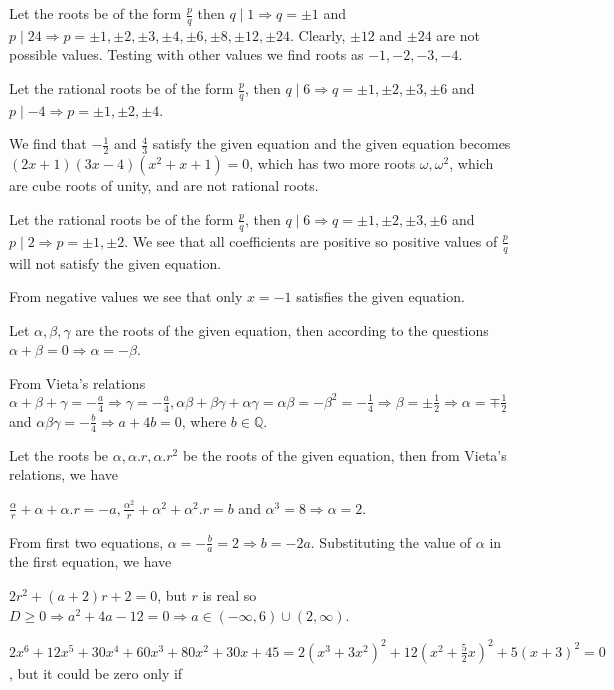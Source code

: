   Let the roots be of the form $\frac{p}{q}$ then $q\mid 1 \Rightarrow q = \pm 1$ and $p\mid 24 \Rightarrow
  p = \pm1, \pm2, \pm3, \pm4, \pm6, \pm8, \pm12, \pm24$. Clearly, $\pm12$ and $\pm24$ are not possible
  values. Testing with other values we find roots as $-1, -2, -3, -4$.
\item Let the rational roots be of the form $\frac{p}{q}$, then $q\mid 6 \Rightarrow q = \pm1, \pm2, \pm3,
  \pm6$ and $p\mid -4 \Rightarrow p = \pm 1, \pm2, \pm4$.

  We find that $-\frac{1}{2}$ and $\frac{4}{3}$ satisfy the given equation and the given equation becomes
  $(2x + 1)(3x - 4)(x^2 + x + 1) = 0$, which has two more roots $\omega, \omega^2$, which are cube roots of
  unity, and are not rational roots.
\item Let the rational roots be of the form $\frac{p}{q}$, then $q\mid 6 \Rightarrow q = \pm1, \pm2, \pm3,
  \pm6$ and $p\mid 2 \Rightarrow p = \pm1, \pm2$. We see that all coefficients are positive so positive
  values of $\frac{p}{q}$ will not satisfy the given equation.

  From negative values we see that only $x = -1$ satisfies the given equation.
\item Let $\alpha, \beta, \gamma$ are the roots of the given equation, then according to the questions
  $\alpha + \beta = 0 \Rightarrow \alpha = -\beta$.

  From Vieta's relations $\alpha + \beta + \gamma = -\frac{a}{4}\Rightarrow \gamma = -\frac{a}{4}, \alpha \beta
  + \beta\gamma + \alpha\gamma = \alpha\beta = -\beta^2 = -\frac{1}{4}\Rightarrow \beta =
  \pm\frac{1}{2} \Rightarrow \alpha = \mp\frac{1}{2}$ and $\alpha\beta\gamma = -\frac{b}{4}\Rightarrow a +
  4b = 0$, where $b\in\mathbb{Q}$.
\item Let the roots be $\alpha, \alpha.r, \alpha.r^2$ be the roots of the given equation, then from Vieta's
  relations, we have

  $\frac{\alpha}{r} + \alpha + \alpha.r = -a, \frac{\alpha^2}{r} + \alpha^2 + \alpha^2.r = b$ and $\alpha^3
  = 8 \Rightarrow \alpha = 2$.

  From first two equations, $\alpha = -\frac{b}{a} = 2 \Rightarrow b = -2a$. Substituting the value of
  $\alpha$ in the first equation, we have

  $2r^2 + (a + 2)r + 2 = 0$, but $r$ is real so $D\geq 0 \Rightarrow a^2 + 4a - 12 = 0 \Rightarrow
  a\in(-\infty, 6)\cup(2, \infty)$.
\item $2x^6 + 12x^5 + 30x^4 + 60x^3 + 80x^2 + 30x + 45 = 2(x^3 + 3x^2)^2 + 12\left(x^2 +
  \frac{5}{2}x\right)^2 + 5(x + 3)^2 = 0$, but it could be zero only if

